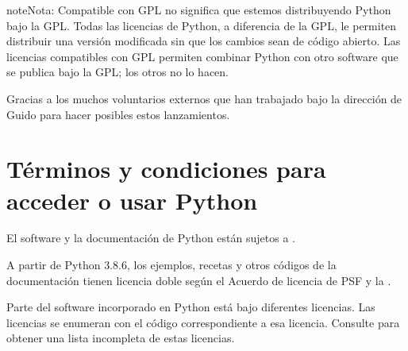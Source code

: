 \documentclass[a4,10pt,spanish]{sphinxmanual}
\begin{document}
\begin{sphinxadmonition}{note}{Nota:}
\sphinxAtStartPar
Compatible con GPL no significa que estemos distribuyendo Python bajo la GPL. Todas las licencias de Python, a diferencia de la GPL, le permiten distribuir una versión modificada sin que los cambios sean de código abierto. Las licencias compatibles con GPL permiten combinar Python con otro software que se publica bajo la GPL; los otros no lo hacen.
\end{sphinxadmonition}

\sphinxAtStartPar
Gracias a los muchos voluntarios externos que han trabajado bajo la dirección de Guido para hacer posibles estos lanzamientos.


\section{Términos y condiciones para acceder o usar Python}
\label{\detokenize{license:terms-and-conditions-for-accessing-or-otherwise-using-python}}
\sphinxAtStartPar
El software y la documentación de Python están sujetos a {\hyperref[\detokenize{license:psf-license}]{}}.

\sphinxAtStartPar
A partir de Python 3.8.6, los ejemplos, recetas y otros códigos de la documentación tienen licencia doble según el Acuerdo de licencia de PSF y la {\hyperref[\detokenize{license:bsd0}]{}}.

\sphinxAtStartPar
Parte del software incorporado en Python está bajo diferentes licencias. Las licencias se enumeran con el código correspondiente a esa licencia. Consulte {\hyperref[\detokenize{license:otherlicenses}]{}} para obtener una lista incompleta de estas licencias.
\end{document}
